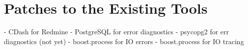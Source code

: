 \documentclass[deska]{subfiles}
\begin{document}
\chapter{Patches to the Existing Tools}
\label{sec:patches}

\begin{abstract}
\end{abstract}

- CDash for Redmine
- PostgreSQL for error diagnostics
- psycopg2 for err diagnostics (not yet)
- boost.process for IO errors
- boost.process for IO tracing
\end{document}
